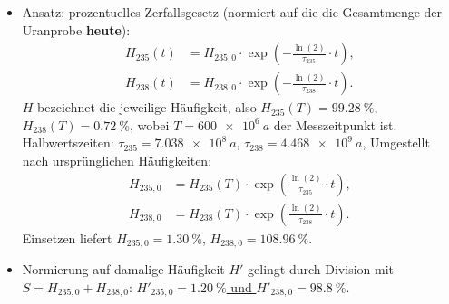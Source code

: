 \documentclass{scrartcl}
\begin{document}
\aufgabe{}
\subaufgabe{}
\begin{itemize}
        \item Ansatz: prozentuelles Zerfallsgesetz (normiert auf die die Gesamtmenge der Uranprobe \textbf{heute}):
        \begin{align*}
                H_{235}(t) &= H_{235,0}\cdot\exp(-\frac{\ln(2)}{\tau_{235}}\cdot t),\\
                H_{238}(t) &= H_{238,0}\cdot\exp(-\frac{\ln(2)}{\tau_{238}}\cdot t).
        \end{align*}
        $H$ bezeichnet die jeweilige Häufigkeit, also $H_{235}(T) = \SI{99.28}{\percent}$, $H_{238}(T) = \SI{0.72}{\percent}$, wobei $T=\SI{600e6}{a}$ der Messzeitpunkt ist. Halbwertszeiten: $\tau_{235}=\SI{7.038e8}{a}$, $\tau_{238}=\SI{4.468e9}{a}$, Umgestellt nach ursprünglichen Häufigkeiten:
        \begin{align*}
                H_{235,0} &= H_{235}(T)\cdot\exp(\frac{\ln(2)}{\tau_{235}}\cdot t),\\
                H_{238,0} &= H_{238}(T)\cdot\exp(\frac{\ln(2)}{\tau_{238}}\cdot t).
        \end{align*}
        Einsetzen liefert $H_{235,0} = \SI{1.30}{\percent}$, $H_{238,0} = \SI{108.96}{\percent}$.
        \item Normierung auf damalige Häufigkeit $H'$ gelingt durch Division mit $S=H_{235,0} + H_{238,0}$: \underline{$H'_{235,0}=\SI{1.20}{\percent}$ und $H'_{238,0}=\SI{98.8}{\percent}$}.
\end{itemize}
\end{document}
